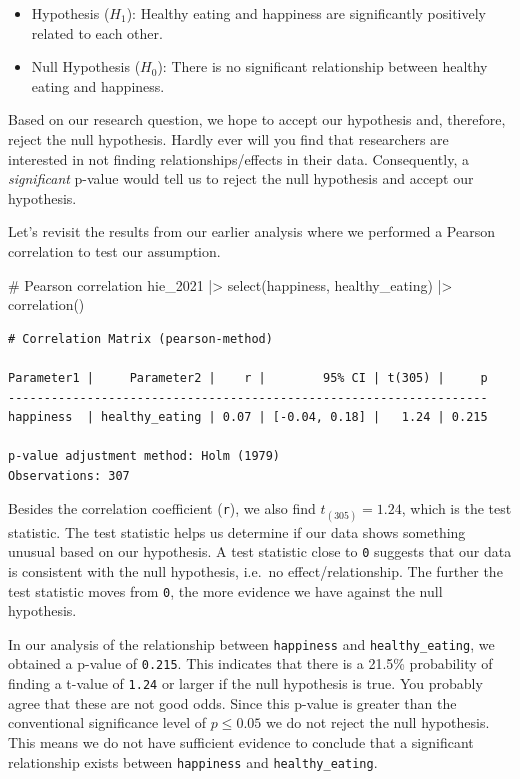 \documentclass[
  letterpaper,
  DIV=11,
  numbers=noendperiod]{scrreprt}
\newenvironment{Shaded}{\begin{snugshade}}{\end{snugshade}}
\newcommand{\CommentTok}[1]{\textcolor[rgb]{0.37,0.37,0.37}{#1}}
\newcommand{\FunctionTok}[1]{\textcolor[rgb]{0.28,0.35,0.67}{#1}}
\newcommand{\NormalTok}[1]{\textcolor[rgb]{0.00,0.23,0.31}{#1}}
\newcommand{\SpecialCharTok}[1]{\textcolor[rgb]{0.37,0.37,0.37}{#1}}
\begin{document}
\begin{itemize}
\item
  Hypothesis (\(H_1\)): Healthy eating and happiness are significantly
  positively related to each other.
\item
  Null Hypothesis (\(H_0\)): There is no significant relationship
  between healthy eating and happiness.
\end{itemize}

Based on our research question, we hope to accept our hypothesis and,
therefore, reject the null hypothesis. Hardly ever will you find that
researchers are interested in not finding relationships/effects in their
data. Consequently, a \emph{significant} p-value would tell us to reject
the null hypothesis and accept our hypothesis.

Let's revisit the results from our earlier analysis where we performed a
Pearson correlation to test our assumption.

\begin{Shaded}
\begin{Highlighting}[]
\CommentTok{\# Pearson correlation}
\NormalTok{hie\_2021 }\SpecialCharTok{|\textgreater{}}
  \FunctionTok{select}\NormalTok{(happiness, healthy\_eating) }\SpecialCharTok{|\textgreater{}}
  \FunctionTok{correlation}\NormalTok{()}
\end{Highlighting}
\end{Shaded}

\begin{verbatim}
# Correlation Matrix (pearson-method)

Parameter1 |     Parameter2 |    r |        95% CI | t(305) |     p
-------------------------------------------------------------------
happiness  | healthy_eating | 0.07 | [-0.04, 0.18] |   1.24 | 0.215

p-value adjustment method: Holm (1979)
Observations: 307
\end{verbatim}

Besides the correlation coefficient (\texttt{r}), we also find
\(t_{(305)} = 1.24\), which is the test statistic. The test statistic
helps us determine if our data shows something unusual based on our
hypothesis. A test statistic close to \texttt{0} suggests that our data
is consistent with the null hypothesis, i.e.~no effect/relationship. The
further the test statistic moves from \texttt{0}, the more evidence we
have against the null hypothesis.

In our analysis of the relationship between \texttt{happiness} and
\texttt{healthy\_eating}, we obtained a p-value of \texttt{0.215}. This
indicates that there is a 21.5\% probability of finding a t-value of
\texttt{1.24} or larger if the null hypothesis is true. You probably
agree that these are not good odds. Since this p-value is greater than
the conventional significance level of \(p \leq 0.05\) we do not reject
the null hypothesis. This means we do not have sufficient evidence to
conclude that a significant relationship exists between
\texttt{happiness} and \texttt{healthy\_eating}.
\end{document}
